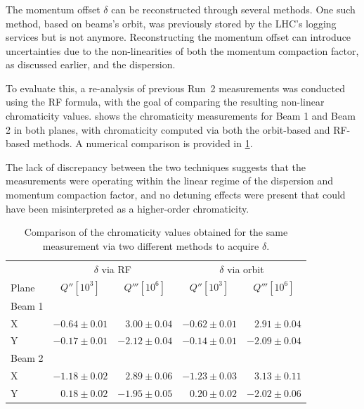 \FloatBarrier
\subsubsection{}

The momentum offset $\delta$ can be reconstructed through several methods. One such method,
based on beams's orbit, was previously stored by the LHC's logging services but is not
anymore. Reconstructing the momentum offset can introduce uncertainties due to the
non-linearities of both the momentum compaction factor, as discussed earlier, and the dispersion.

To evaluate this, a re-analysis of previous Run~2 measurements was conducted using the RF formula,
with the goal of comparing the resulting non-linear chromaticity values.
 shows the chromaticity measurements for Beam 1 and Beam
2 in both planes, with chromaticity computed via both the orbit-based and RF-based methods. A
numerical comparison is provided in \cref{table:very_high_orders:bare_chroma_2016}.

The lack of discrepancy between the two techniques suggests that the measurements were operating
within the linear regime of the dispersion and momentum compaction factor, and no detuning effects
were present that could have been misinterpreted as a higher-order chromaticity.

\begin{table}[!htb]
    \centering
    \begin{tabular}{lrrrr}
        \toprule
              & \multicolumn{2}{c}{$\delta$ via RF}  &  \multicolumn{2}{c}{$\delta$ via orbit} \\
        Plane & \multicolumn{1}{c}{$Q'' [10^3]$}     & \multicolumn{1}{c}{$Q''' [10^6]$} & \multicolumn{1}{c}{$Q'' [10^3]$} & \multicolumn{1}{c}{$Q''' [10^6]$}\\
        \midrule
        Beam 1 &&&& \\
        \hspace{2mm}X & $-0.64 \pm 0.01$ & $ 3.00 \pm 0.04$   & $-0.62 \pm 0.01$ & $ 2.91 \pm 0.04$ \\
        \hspace{2mm}Y & $-0.17 \pm 0.01$ & $-2.12 \pm 0.04$   & $-0.14 \pm 0.01$ & $-2.09 \pm 0.04$ \\
        Beam 2 &&&& \\
        \hspace{2mm}X & $-1.18 \pm 0.02$ & $ 2.89 \pm 0.06$   & $-1.23 \pm 0.03$ & $ 3.13 \pm 0.11$ \\
        \hspace{2mm}Y & $ 0.18 \pm 0.02$ & $-1.95 \pm 0.05$   & $ 0.20 \pm 0.02$ & $-2.02 \pm 0.06$ \\
        \bottomrule
    \end{tabular}
    \caption{Comparison of the chromaticity values obtained for the same measurement via two
    different methods to acquire $\delta$.}
    \label{table:very_high_orders:bare_chroma_2016}
  \end{table}



